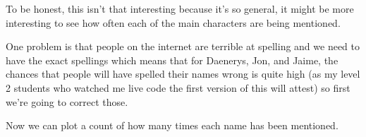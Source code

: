 \documentclass[]{book}
\newenvironment{Shaded}{\begin{snugshade}}{\end{snugshade}}
\newcommand{\DataTypeTok}[1]{\textcolor[rgb]{0.13,0.29,0.53}{#1}}
\newcommand{\KeywordTok}[1]{\textcolor[rgb]{0.13,0.29,0.53}{\textbf{#1}}}
\newcommand{\NormalTok}[1]{#1}
\newcommand{\OperatorTok}[1]{\textcolor[rgb]{0.81,0.36,0.00}{\textbf{#1}}}
\newcommand{\OtherTok}[1]{\textcolor[rgb]{0.56,0.35,0.01}{#1}}
\newcommand{\StringTok}[1]{\textcolor[rgb]{0.31,0.60,0.02}{#1}}
\begin{document}
To be honest, this isn't that interesting because it's so general, it might be more interesting to see how often each of the main characters are being mentioned.

One problem is that people on the internet are terrible at spelling and we need to have the exact spellings which means that for Daenerys, Jon, and Jaime, the chances that people will have spelled their names wrong is quite high (as my level 2 students who watched me live code the first version of this will attest) so first we're going to correct those.

\begin{Shaded}
\end{Shaded}

Now we can plot a count of how many times each name has been mentioned.

\begin{Shaded}
\end{Shaded}
\end{document}
